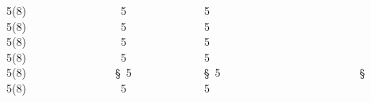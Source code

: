 5(8)                { }5             { }5                         {} 
5(8)                { }5             { }5                         {} 
5(8)                {\cjk{}} 5             {\cjk{}} 5                         {\cjk{}} 
5(8)                {\cjk{}} 5             {\cjk{}} 5                         {\cjk{}} 
5(8)                § 5             § 5                         § 
5(8)                {\cjk{}} 5             {\cjk{}} 5                         {\cjk{}} 

\endgroup{}\endgroup{}\begin{multicols}{2}\end{multicols}
